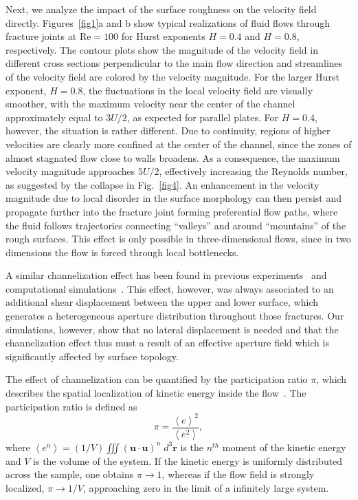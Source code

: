 \documentclass[aps,pre,
superscriptaddress,
twocolumn,
notitlepage,
10pt,]{revtex4-1}
\begin{document}
Next, we analyze the impact of the surface roughness on the velocity field directly.
Figures~\ref{fig1}a and b show typical realizations
of fluid flows through fracture joints at $\mathrm{Re} = 100$ for Hurst
exponents $H = 0.4$ and $H = 0.8$, respectively. The contour plots show the
magnitude of the velocity field in different cross sections perpendicular
to the main flow direction and streamlines of the velocity field are
colored by the velocity magnitude. For the larger Hurst exponent, $H =
0.8$, the fluctuations in the local velocity field are visually smoother,
with the maximum velocity near the center of the channel approximately
equal to $3U/2$, as expected for parallel plates. For $H=0.4$, however, the
situation is rather different. Due to continuity, regions of higher
velocities are clearly more confined at the center of the channel, since the
zones of almost stagnated flow close to walls broadens. As a
consequence, the maximum velocity magnitude approaches $5U/2$, effectively
increasing the Reynolds number, as suggested by the collapse in
Fig.~\ref{fig4}. An enhancement in the velocity magnitude due to local
disorder in the surface morphology can then persist and propagate further
into the fracture joint forming preferential flow paths, where the fluid
follows trajectories connecting ``valleys'' and around ``mountains'' of the
rough surfaces. This effect is only possible in three-dimensional flows,
since in two dimensions the flow is forced through local bottlenecks.

A similar channelization effect has been found in previous
experiments~\cite{Ishibashi2015} and computational simulations~\cite{Drazer2002,
	Lo2014, Huang2017}. This effect, however, was always associated to an additional
shear displacement between the upper and lower surface, which generates a
heterogeneous aperture distribution throughout those fractures.
Our simulations, however, show that no lateral displacement is needed and that
the channelization effect thus must a result of an effective aperture field
which is significantly affected by surface topology.

The  effect of channelization can be quantified by the participation ratio
$\pi$, which describes the spatial localization of kinetic energy inside
the flow~\cite{Andrade1999}. The participation ratio is defined as
\begin{equation}
\pi = \frac{\left<e\right>^2}{\left<e^2\right>},
\end{equation}
where $ \left<e^n\right> = (1/V) \iiint
\left(\mathbf{u}\cdot\mathbf{u}\right)^{n} \; d^3\mathbf{r} $ is the $
n^{th} $ moment of the kinetic energy and $ V $ is the volume of the
system. If the kinetic energy is uniformly distributed across the sample,
one obtains $\pi \rightarrow 1$, whereas if the flow field is strongly
localized, $ \pi \rightarrow 1/V$, approaching zero in the limit of a
infinitely large system.
\end{document}
